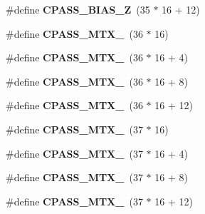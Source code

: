 \begin{DoxyCompactItemize}
\item 
\#define {\bfseries C\+P\+A\+S\+S\+\_\+\+B\+I\+A\+S\+\_\+Z}~(35 $\ast$ 16 + 12)\hypertarget{group___d_r_i_v_e_r_s_gab931596f83f81d20cb6f79b99a6d71c7}{}\label{group___d_r_i_v_e_r_s_gab931596f83f81d20cb6f79b99a6d71c7}

\item 
\#define {\bfseries C\+P\+A\+S\+S\+\_\+\+M\+T\+X\+\_}~(36 $\ast$ 16)\hypertarget{group___d_r_i_v_e_r_s_ga6a6966c355589a06d8fb29efaff9902f}{}\label{group___d_r_i_v_e_r_s_ga6a6966c355589a06d8fb29efaff9902f}

\item 
\#define {\bfseries C\+P\+A\+S\+S\+\_\+\+M\+T\+X\+\_}~(36 $\ast$ 16 + 4)\hypertarget{group___d_r_i_v_e_r_s_gaf0c24262e6d095fbd0b259111221d22f}{}\label{group___d_r_i_v_e_r_s_gaf0c24262e6d095fbd0b259111221d22f}

\item 
\#define {\bfseries C\+P\+A\+S\+S\+\_\+\+M\+T\+X\+\_}~(36 $\ast$ 16 + 8)\hypertarget{group___d_r_i_v_e_r_s_gac5f1350e9764b47bad1e5338e1f42e42}{}\label{group___d_r_i_v_e_r_s_gac5f1350e9764b47bad1e5338e1f42e42}

\item 
\#define {\bfseries C\+P\+A\+S\+S\+\_\+\+M\+T\+X\+\_}~(36 $\ast$ 16 + 12)\hypertarget{group___d_r_i_v_e_r_s_ga345d7d640ac1340e3eaf23c4efc9cd80}{}\label{group___d_r_i_v_e_r_s_ga345d7d640ac1340e3eaf23c4efc9cd80}

\item 
\#define {\bfseries C\+P\+A\+S\+S\+\_\+\+M\+T\+X\+\_}~(37 $\ast$ 16)\hypertarget{group___d_r_i_v_e_r_s_gad6a7e3d40cf198dd69e7d3caeefc8453}{}\label{group___d_r_i_v_e_r_s_gad6a7e3d40cf198dd69e7d3caeefc8453}

\item 
\#define {\bfseries C\+P\+A\+S\+S\+\_\+\+M\+T\+X\+\_}~(37 $\ast$ 16 + 4)\hypertarget{group___d_r_i_v_e_r_s_ga5f4053bd26eb944d431d93d282be9296}{}\label{group___d_r_i_v_e_r_s_ga5f4053bd26eb944d431d93d282be9296}

\item 
\#define {\bfseries C\+P\+A\+S\+S\+\_\+\+M\+T\+X\+\_}~(37 $\ast$ 16 + 8)\hypertarget{group___d_r_i_v_e_r_s_ga452f20a72e035275b876e8cc592691f6}{}\label{group___d_r_i_v_e_r_s_ga452f20a72e035275b876e8cc592691f6}

\item 
\#define {\bfseries C\+P\+A\+S\+S\+\_\+\+M\+T\+X\+\_}~(37 $\ast$ 16 + 12)\hypertarget{group___d_r_i_v_e_r_s_gae126c2fef7bf856f38d6d04b7504a3c4}{}\label{group___d_r_i_v_e_r_s_gae126c2fef7bf856f38d6d04b7504a3c4}


\end{DoxyCompactItemize}
